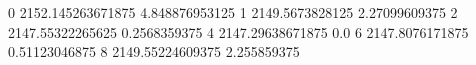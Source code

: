 0 2152.145263671875 4.848876953125
1 2149.5673828125 2.27099609375
2 2147.55322265625 0.2568359375
4 2147.29638671875 0.0
6 2147.8076171875 0.51123046875
8 2149.55224609375 2.255859375
